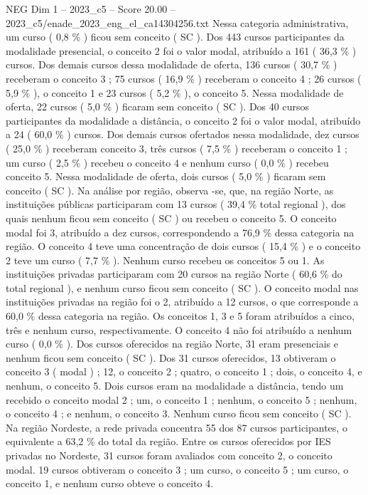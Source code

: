 \begin{textsample}{NEG Dim 1 – 2023\_c5 – Score 20.00 – 2023\_c5/enade\_2023\_eng\_el\_ca14304256.txt}
Nessa categoria administrativa, um curso ( 0,8 \% ) ficou sem conceito ( SC ).
Dos 443 cursos participantes da modalidade presencial, o conceito 2 foi o valor modal, atribuído a 161 ( 36,3 \% ) cursos.
Dos demais cursos dessa modalidade de oferta, 136 cursos ( 30,7 \% ) receberam o conceito 3 ; 75 cursos ( 16,9 \% ) receberam o conceito 4 ; 26 cursos ( 5,9 \% ), o conceito 1 e 23 cursos ( 5,2 \% ), o conceito 5.
Nessa modalidade de oferta, 22 cursos ( 5,0 \% ) ficaram sem conceito ( SC ).
Dos 40 cursos participantes da modalidade a distância, o conceito 2 foi o valor modal, atribuído a 24 ( 60,0 \% ) cursos.
Dos demais cursos ofertados nessa modalidade, dez cursos ( 25,0 \% ) receberam conceito 3, três cursos ( 7,5 \% ) receberam o conceito 1 ; um curso ( 2,5 \% ) recebeu o conceito 4 e nenhum curso ( 0,0 \% ) recebeu conceito 5.
Nessa modalidade de oferta, dois cursos ( 5,0 \% ) ficaram sem conceito ( SC ).
Na análise por região, observa -se, que, na região Norte, as instituições públicas participaram com 13 cursos ( 39,4 \% total regional ), dos quais nenhum ficou sem conceito ( SC ) ou recebeu o conceito 5.
O conceito modal foi 3, atribuído a dez cursos, correspondendo a 76,9 \% dessa categoria na região.
O conceito 4 teve uma concentração de dois cursos ( 15,4 \% ) e o conceito 2 teve um curso ( 7,7 \% ).
Nenhum curso recebeu os conceitos 5 ou 1.
As instituições privadas participaram com 20 cursos na região Norte ( 60,6 \% do total regional ), e nenhum curso ficou sem conceito ( SC ).
O conceito modal nas instituições privadas na região foi o 2, atribuído a 12 cursos, o que corresponde a 60,0 \% dessa categoria na região.
Os conceitos 1, 3 e 5 foram atribuídos a cinco, três e nenhum curso, respectivamente.
O conceito 4 não foi atribuído a nenhum curso ( 0,0 \% ).
Dos cursos oferecidos na região Norte, 31 eram presenciais e nenhum ficou sem conceito ( SC ).
Dos 31 cursos oferecidos, 13 obtiveram o conceito 3 ( modal ) ; 12, o conceito 2 ; quatro, o conceito 1 ; dois, o conceito 4, e nenhum, o conceito 5.
Dois cursos eram na modalidade a distância, tendo um recebido o conceito modal 2 ; um, o conceito 1 ; nenhum, o conceito 5 ; nenhum, o conceito 4 ; e nenhum, o conceito 3.
Nenhum curso ficou sem conceito ( SC ).
Na região Nordeste, a rede privada concentra 55 dos 87 cursos participantes, o equivalente a 63,2 \% do total da região.
Entre os cursos oferecidos por IES privadas no Nordeste, 31 cursos foram avaliados com conceito 2, o conceito modal. 19 cursos obtiveram o conceito 3 ; um curso, o conceito 5 ; um curso, o conceito 1, e nenhum curso obteve o conceito 4.

\end{textsample}
